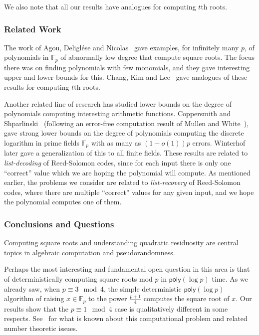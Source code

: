\documentclass{article}
\newcommand{\F}{\mathbb{F}}
\newcommand{\poly}{\mathsf{poly}}
\begin{document}
We also note that all our results have analogues for computing $t$th roots.

\subsubsection*{Related Work}

The work of Agou, Deligl{\'e}se and Nicolas~\cite{ADN-sqrt} gave examples, for infinitely many $p$, of polynomials in $\F_p$ of abnormally low degree that compute square roots. The focus there was on finding polynomials with few monomials, and they gave interesting upper and lower bounds for this. Chang, Kim and Lee~\cite{CKL-nthroot} gave analogues of these results for computing $t$th roots. 


Another related line of research has studied lower bounds on the degree of polynomials computing interesting arithmetic functions.
Coppersmith and Shparlinski~\cite{CS-dlog} (following an error-free computation result of Mullen and White~\cite{MW-dlog}), gave strong lower bounds on the degree of polynomials computing the discrete logarithm in prime fields $\F_p$ with as many as $(1-o(1))p$ errors. Winterhof~\cite{W-dlog} later gave a generalization of this to all finite fields. These results are related to {\em list-decoding} of Reed-Solomon codes, since for each input there is only one ``correct'' value which we are hoping the polynomial will compute. As mentioned earlier, the problems we consider are related to {\em list-recovery} of Reed-Solomon codes, where there are multiple ``correct'' values for any given input, and we hope the polynomial computes one of them.


\subsubsection*{Conclusions and Questions}

Computing square roots and understanding quadratic residuosity are central topics in algebraic computation and pseudorandomness.

Perhaps the most interesting and fundamental open question in this area is that of deterministically computing square roots mod $p$ in $\poly(\log p)$ time.
As we already saw, when $p \equiv 3 \mod 4$, the simple deterministic $\poly(\log p)$ algorithm of raising $x \in \F_p$ to the power $\frac{p+1}{4}$ computes the square root of $x$. Our results show that the $p \equiv 1 \mod 4$ case is qualitatively different in some respects. 
See~\cite{BachShallit,GerhardGathen,Shoup} for what is known about this computational problem and related number theoretic issues.
\end{document}
